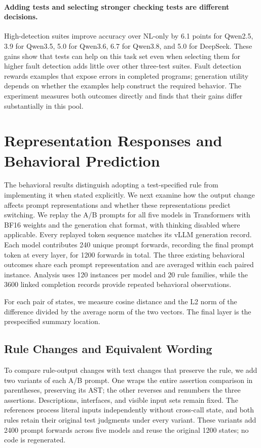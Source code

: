 \documentclass[acmsmall,screen,review,anonymous]{acmart}
\begin{document}
\paragraph{Adding tests and selecting stronger checking tests are different decisions.}
High-detection suites improve accuracy over NL-only by 6.1 points for Qwen2.5, 3.9 for Qwen3.5, 5.0 for Qwen3.6, 6.7 for Qwen3.8, and 5.0 for DeepSeek.
These gains show that tests can help on this task set even when selecting them for higher fault detection adds little over other three-test suites.
Fault detection rewards examples that expose errors in completed programs; generation utility depends on whether the examples help construct the required behavior.
The experiment measures both outcomes directly and finds that their gains differ substantially in this pool.

\section{Representation Responses and Behavioral Prediction}
\label{sec:paired-representations}

The behavioral results distinguish adopting a test-specified rule from implementing it when stated explicitly.
We next examine how the output change affects prompt representations and whether these representations predict switching.
We replay the A/B prompts for all five models in Transformers with BF16 weights and the generation chat format, with thinking disabled where applicable.
Every replayed token sequence matches its vLLM generation record.
Each model contributes 240 unique prompt forwards, recording the final prompt token at every layer, for 1200 forwards in total.
The three existing behavioral outcomes share each prompt representation and are averaged within each paired instance.
Analysis uses 120 instances per model and 20 rule families, while the 3600 linked completion records provide repeated behavioral observations.

For each pair of states, we measure cosine distance and the L2 norm of the difference divided by the average norm of the two vectors.
The final layer is the prespecified summary location.

\subsection{Rule Changes and Equivalent Wording}
To compare rule-output changes with text changes that preserve the rule, we add two variants of each A/B prompt.
One wraps the entire assertion comparison in parentheses, preserving its AST; the other reverses and renumbers the three assertions.
Descriptions, interfaces, and visible input sets remain fixed.
The references process literal inputs independently without cross-call state, and both rules retain their original test judgments under every variant.
These variants add 2400 prompt forwards across five models and reuse the original 1200 states; no code is regenerated.
\end{document}
